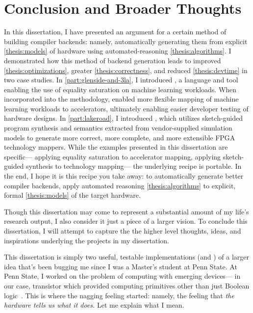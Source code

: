 \chapter{Conclusion and Broader Thoughts}


In this dissertation,
  I have presented an argument
  for a certain method of building compiler backends:
  namely,
  automatically generating them
  from explicit \cref{thesis:models}
  of hardware
  using \gls{automated-reasoning} \cref{thesis:algorithms}.
I demonstrated how this method of backend generation
  leads to improved
  \cref{thesis:optimizations},
  greater 
  \cref{thesis:correctness}, and
  reduced
  \cref{thesis:devtime}
  in two case studies.
In \cref{part:glenside-and-3la},
  I introduced
  \g, a language and tool
  enabling the use of equality saturation
  on machine learning workloads.
When incorporated into the 
  \TLA methodology, \g
  enabled more flexible mapping
  of machine learning workloads
  to accelerators,
  ultimately enabling
  easier developer testing
  of hardware designs.
In \cref{part:lakeroad},
  I introduced \lr, which
  utilizes sketch-guided program synthesis
  and semantics extracted from vendor-supplied simulation models
  to generate more correct,
  more complete, and more extensible
  FPGA technology mappers.
While the examples presented in this dissertation
  are specific---%
  applying equality saturation to accelerator mapping,
  applying sketch-guided synthesis to technology mapping---%
  the underlying recipe is portable.
In the end, I hope it is this recipe you take away:
  to automatically generate better compiler backends,
  apply automated reasoning \cref{thesis:algorithms}
  to explicit, formal \cref{thesis:models} of the target hardware.
  

Though this dissertation
  may come to represent
  a substantial amount of my life's research output,
  I also consider it just a piece
  of a larger vision.
To conclude this dissertation,
  I will attempt to capture the
  the higher level thoughts,
  ideas, and inspirations
  underlying the projects in my dissertation.

This dissertation is simply
  two useful, testable
  implementations (\g and \lr)
  of a larger idea
  that's been bugging me
  since I was a Master's student
  at Penn State.
At Penn State,
  I worked on the problem of
  computing with emerging devices---%
  in our case, transistor which
  provided computing primitives other than just
  Boolean logic~\cite{raychowdhury2018computing,yoon2018fefet,yoon2019ferrofet}.
This is where the nagging feeling started:
  namely, the feeling that
  \textit{the hardware tells us what it does.}
Let me  explain what I mean.

